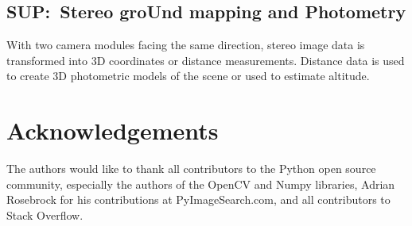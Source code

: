 \documentclass[conference]{IEEEtran} %
\begin{document}
\subsection{SUP:~Stereo groUnd mapping and Photometry}
\label{subsec:sup}
With two camera modules facing the same direction, stereo image data is transformed into 3D coordinates or distance measurements.
Distance data is used to create 3D photometric models of the scene or used to estimate altitude.

\section*{Acknowledgements}
The authors would like to thank all contributors to the Python open source community, especially the authors of the OpenCV and Numpy libraries, Adrian Rosebrock for his contributions at PyImageSearch.com, and all contributors to Stack Overflow.




\end{document}
